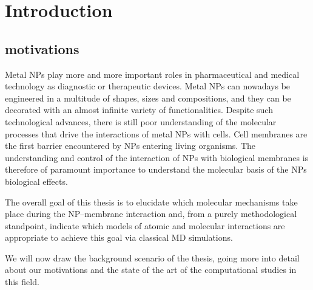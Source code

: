 \chapter{Introduction}
%
%
%

\begingroup
\toclesssection
\introductionStyle

\section{motivations}
Metal \acp{NP} play more and more important roles in pharmaceutical and medical technology as diagnostic or therapeutic devices. Metal \acp{NP} can nowadays be engineered in a multitude of shapes, sizes and compositions, and they can be decorated with an almost infinite variety of functionalities. Despite such technological advances, there is still poor understanding of the molecular processes that drive the interactions of metal \acp{NP} with cells. Cell membranes are the first barrier encountered by \acp{NP} entering living organisms. The understanding and control of the interaction of \acp{NP} with biological membranes is therefore of paramount importance to understand the molecular basis of the \acp{NP} biological effects.

The overall goal of this thesis is to elucidate which molecular mechanisms take place during the \ac{NP}--membrane interaction and, from a purely methodological standpoint, indicate which models of atomic and molecular interactions are appropriate to achieve this goal via classical \ac{MD} simulations.

We will now draw the background scenario of the thesis, going more into detail about our motivations and the state of the art of the computational studies in this field.

